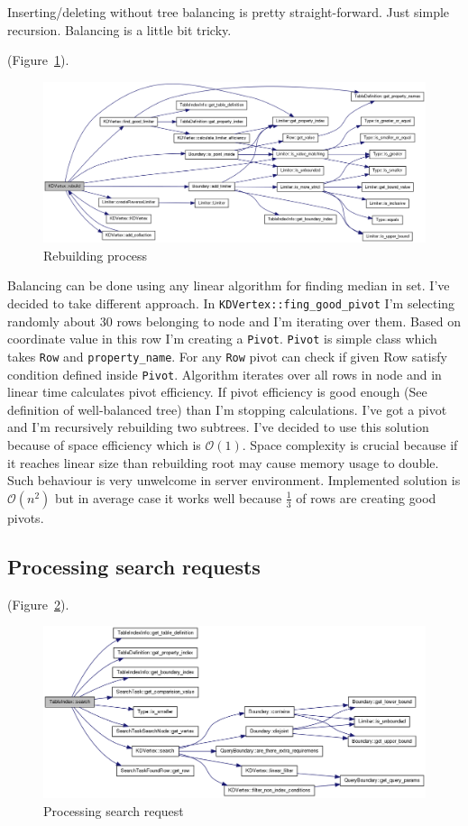 \documentclass[10pt,a4paper]{article}
\newcommand{\Oh}{\mathcal{O}}
\begin{document}
Inserting/deleting without tree balancing is pretty straight-forward. Just simple recursion. Balancing is a little bit tricky. 

 (Figure~\ref{fig:rebuild}).

\begin{figure}
\centering
  \includegraphics[width=16cm]{rebuild}
  \caption{Rebuilding process}
  \label{fig:rebuild}
\end{figure}

Balancing can be done using any linear algorithm for finding median in set. I've decided to take different approach. In \verb|KDVertex::fing_good_pivot| I'm selecting randomly about 30 rows belonging to node and I'm iterating over them. Based on coordinate value in this row I'm creating a \verb|Pivot|. \verb|Pivot| is simple class which takes \verb|Row| and \verb|property_name|. For any \verb|Row| pivot can check if given Row satisfy condition defined inside \verb|Pivot|. Algorithm iterates over all rows in node and in linear time calculates pivot efficiency. If pivot efficiency is good enough (See definition of well-balanced tree) than I'm stopping calculations. I've got a pivot and I'm recursively rebuilding two subtrees. I've decided to use this solution because of space efficiency which is $\Oh(1)$. Space complexity is crucial because if it reaches linear size than rebuilding root may cause memory usage to double. Such behaviour is very unwelcome in server environment. Implemented solution is $\Oh(n^2)$ but in average case it works well because $\frac{1}{3}$ of rows are creating good pivots.

\subsection{Processing search requests}

 (Figure~\ref{fig:search}).

\begin{figure}
\centering
  \includegraphics[width=16cm]{search}
  \caption{Processing search request}
  \label{fig:search}
\end{figure}
\end{document}
